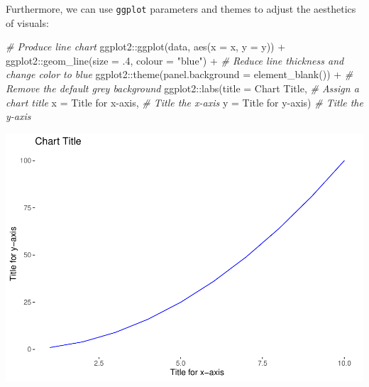 \documentclass[
]{book}
\newenvironment{Shaded}{\begin{snugshade}}{\end{snugshade}}
\newcommand{\AttributeTok}[1]{\textcolor[rgb]{0.77,0.63,0.00}{#1}}
\newcommand{\CommentTok}[1]{\textcolor[rgb]{0.56,0.35,0.01}{\textit{#1}}}
\newcommand{\DecValTok}[1]{\textcolor[rgb]{0.00,0.00,0.81}{#1}}
\newcommand{\FunctionTok}[1]{\textcolor[rgb]{0.00,0.00,0.00}{#1}}
\newcommand{\NormalTok}[1]{#1}
\newcommand{\SpecialCharTok}[1]{\textcolor[rgb]{0.00,0.00,0.00}{#1}}
\newcommand{\StringTok}[1]{\textcolor[rgb]{0.31,0.60,0.02}{#1}}
\begin{document}
Furthermore, we can use \texttt{ggplot} parameters and themes to adjust the aesthetics of visuals:

\begin{Shaded}
\begin{Highlighting}[]
\CommentTok{\# Produce line chart}
\NormalTok{ggplot2}\SpecialCharTok{::}\FunctionTok{ggplot}\NormalTok{(data, }\FunctionTok{aes}\NormalTok{(}\AttributeTok{x =}\NormalTok{ x, }\AttributeTok{y =}\NormalTok{ y)) }\SpecialCharTok{+}
\NormalTok{ggplot2}\SpecialCharTok{::}\FunctionTok{geom\_line}\NormalTok{(}\AttributeTok{size =}\NormalTok{ .}\DecValTok{4}\NormalTok{, }\AttributeTok{colour =} \StringTok{"blue"}\NormalTok{) }\SpecialCharTok{+} \CommentTok{\# Reduce line thickness and change color to blue}
\NormalTok{ggplot2}\SpecialCharTok{::}\FunctionTok{theme}\NormalTok{(}\AttributeTok{panel.background =} \FunctionTok{element\_blank}\NormalTok{()) }\SpecialCharTok{+} \CommentTok{\# Remove the default grey background}
\NormalTok{ggplot2}\SpecialCharTok{::}\FunctionTok{labs}\NormalTok{(}\AttributeTok{title =} \StringTok{\textquotesingle{}Chart Title\textquotesingle{}}\NormalTok{, }\CommentTok{\# Assign a chart title}
              \AttributeTok{x =} \StringTok{\textquotesingle{}Title for x{-}axis\textquotesingle{}}\NormalTok{, }\CommentTok{\# Title the x{-}axis}
              \AttributeTok{y =} \StringTok{\textquotesingle{}Title for y{-}axis\textquotesingle{}}\NormalTok{) }\CommentTok{\# Title the y{-}axis}
\end{Highlighting}
\end{Shaded}

\includegraphics{The_Fundamentals_of_People_Analytics_files/figure-latex/unnamed-chunk-52-1.pdf}
\end{document}
